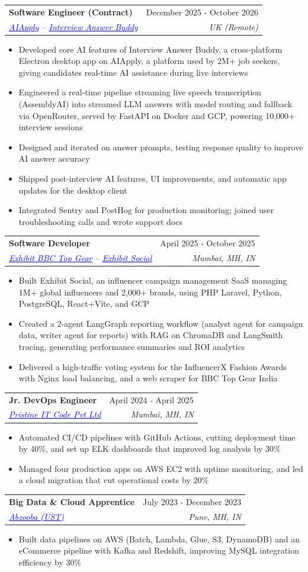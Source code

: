 \documentclass[letterpaper,11pt]{article}
\makeatletter
\newcommand{\resumeItem}[1]{
  \item\small{
    {#1 \vspace{-1pt}}
  }
}
\newcommand{\resumeSubheading}[4]{
  \vspace{-3pt}\item
    \begin{tabular*}{0.97\textwidth}[t]{l@{\extracolsep{\fill}}r}
      \textbf{#1} & #2 \\
      \textit{\small#3} & \textit{\small #4} \\
    \end{tabular*}\vspace{-6pt}
}
\newcommand{\resumeItemListStart}{\begin{itemize}}
\newcommand{\resumeItemListEnd}{\end{itemize}\vspace{-2pt}}
\makeatother
\begin{document}
\resumeSubheading
{Software Engineer (Contract)}{December 2025 - October 2026}
{\href{https://aiapply.co}{\textcolor{blue}{\underline{AIApply}}} -- \href{https://aiapply.co/interview-answer-buddy}{\textcolor{blue}{\underline{Interview Answer Buddy}}}}{UK (Remote)}
\resumeItemListStart
\resumeItem{Developed core AI features of Interview Answer Buddy, a cross-platform Electron desktop app on AIApply, a platform used by 2M+ job seekers, giving candidates real-time AI assistance during live interviews}
\resumeItem{Engineered a real-time pipeline streaming live speech transcription (AssemblyAI) into streamed LLM answers with model routing and fallback via OpenRouter, served by FastAPI on Docker and GCP, powering 10,000+ interview sessions}
\resumeItem{Designed and iterated on answer prompts, testing response quality to improve AI answer accuracy}
\resumeItem{Shipped post-interview AI features, UI improvements, and automatic app updates for the desktop client}
\resumeItem{Integrated Sentry and PostHog for production monitoring; joined user troubleshooting calls and wrote support docs}
\resumeItemListEnd

\resumeSubheading
{Software Developer}{April 2025 - October 2025}
{\href{https://www.exhibit.co.in}{\textcolor{blue}{\underline{Exhibit BBC Top Gear}}} -- \href{https://app.exhibit.social}{\textcolor{blue}{\underline{Exhibit Social}}}}{Mumbai, MH, IN}
\resumeItemListStart
\resumeItem{Built Exhibit Social, an influencer campaign management SaaS managing 1M+ global influencers and 2,000+ brands, using PHP Laravel, Python, PostgreSQL, React+Vite, and GCP}
\resumeItem{Created a 2-agent LangGraph reporting workflow (analyst agent for campaign data, writer agent for reports) with RAG on ChromaDB and LangSmith tracing, generating performance summaries and ROI analytics}
\resumeItem{Delivered a high-traffic voting system for the InfluencerX Fashion Awards with Nginx load balancing, and a web scraper for BBC Top Gear India}
\resumeItemListEnd

\resumeSubheading
{Jr. DevOps Engineer}{April 2024 - April 2025}
{\href{https://pristine-code.com}{\textcolor{blue}{\underline{Pristine IT Code Pvt Ltd}}}}{Mumbai, MH, IN}
\resumeItemListStart
\resumeItem{Automated CI/CD pipelines with GitHub Actions, cutting deployment time by 40\%, and set up ELK dashboards that improved log analysis by 30\%}
\resumeItem{Managed four production apps on AWS EC2 with uptime monitoring, and led a cloud migration that cut operational costs by 20\%}
\resumeItemListEnd

\resumeSubheading
{Big Data \& Cloud Apprentice}{July 2023 - December 2023}
{\href{https://www.ust.com/en}{\textcolor{blue}{\underline{Abzooba (UST)}}}}{Pune, MH, IN}
\resumeItemListStart
\resumeItem{Built data pipelines on AWS (Batch, Lambda, Glue, S3, DynamoDB) and an eCommerce pipeline with Kafka and Redshift, improving MySQL integration efficiency by 30\%}
\resumeItemListEnd
\end{document}
